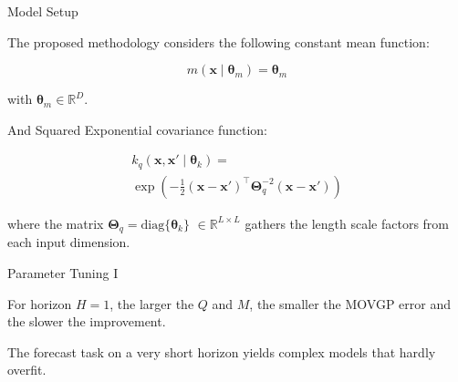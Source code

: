 \documentclass[10pt, xcolor=table]{beamer}
\newlength\figureheight
\newlength\figurewidth
\begin{document}
\begin{frame}{Model Setup}
\begin{multicols}{2}
    The proposed methodology considers the following constant mean function:
    
    \begin{equation*}
        m(\mathbf{x} \mid \bm{\theta}_m) = \bm{\theta}_m
    \end{equation*}
    
    \begin{figure}[htpb]
        \centering 
        \setlength\figurewidth{\columnwidth}
        \setlength{}
        
    \end{figure}

    with $\bm{\theta}_m\in\mathbb{R}^D$.
    
    \columnbreak
    
    And Squared Exponential covariance function:
    
    \begin{multline*}
        k_q(\mathbf{x}, \mathbf{x}' \mid \bm{\theta}_k) = \\ \exp \left(-\frac{1}{2}(\mathbf{x} - \mathbf{x}')^\top \bm{\Theta}_q^{-2}(\mathbf{x} - \mathbf{x}')\right)
    \end{multline*}
    
    \begin{figure}[htpb]
        \centering 
        \setlength\figurewidth{\columnwidth}
        \setlength{}
        
    \end{figure}

    where the matrix $\bm{\Theta}_q=\text{diag}\{\bm{\theta}_k\}$ $\in \mathbb{R}^{L \times L}$ gathers the length scale factors from each input dimension.
    
\end{multicols}
\end{frame}


\begin{frame}{Parameter Tuning I}

    For horizon $H=1$, the larger the $Q$ and $M$, the smaller the MOVGP error and the slower the improvement. 

    \begin{figure}[htpb]
     \centering
     \setlength{}
     \setlength{}
    \end{figure}

    \textcolor{myNewColorA}{The forecast task on a very short horizon yields complex models that hardly overfit.}
    
\end{frame}
\end{document}
